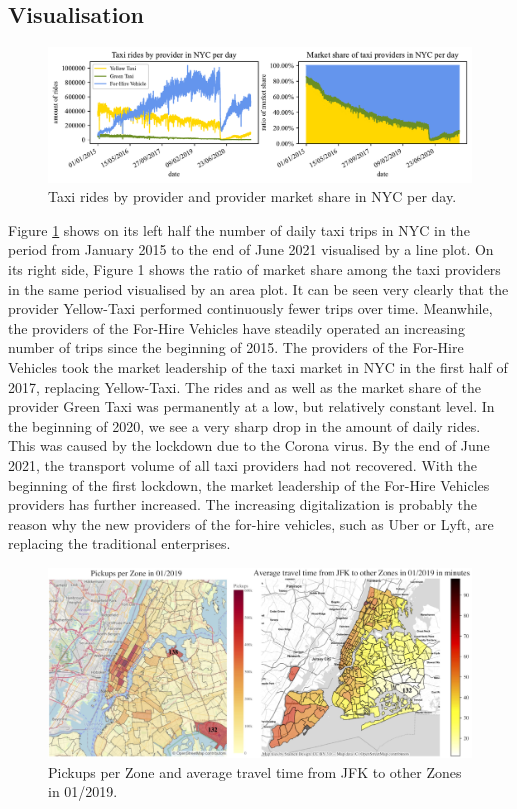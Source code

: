 \documentclass{article}
\begin{document}
\subsection{Visualisation}
\begin{figure}
  \setlength{}
  \centering
  \includegraphics[scale=0.63]{fig/taxi-rides-over-time.pdf}
  \caption{Taxi rides by provider and provider market share in NYC per day.}
  \label{fig:taxi-rides-over-time}
\end{figure}
\setlength{\textfloatsep}{10pt}
Figure \ref{fig:taxi-rides-over-time} shows on its left half the number of daily taxi trips in NYC in the period from January 2015 to the end of June 2021 visualised by a line plot. On its right side, Figure 1 shows the ratio of market share among the taxi providers in the same period visualised by an area plot. It can be seen very clearly that the provider Yellow-Taxi performed continuously fewer trips over time. Meanwhile, the providers of the For-Hire Vehicles have steadily operated an increasing number of trips since the beginning of 2015. The providers of the For-Hire Vehicles took the market leadership of the taxi market in NYC in the first half of 2017, replacing Yellow-Taxi. The rides and as well as the market share of the provider Green Taxi was permanently at a low, but relatively constant level. In the beginning of 2020, we see a very sharp drop in the amount of daily rides. This was caused by the lockdown due to the Corona virus. By the end of June 2021, the transport volume of all taxi providers had not recovered. With the beginning of the first lockdown, the market leadership of the For-Hire Vehicles providers has further increased. The increasing digitalization is probably the reason why the new providers of the for-hire vehicles, such as Uber or Lyft, are replacing the traditional enterprises.
\begin{figure}
  \setlength{}
  \centering
  \includegraphics[scale=0.47]{fig/maps-pickup-travel-time.pdf}
  \caption{Pickups per Zone and average travel time from JFK to other Zones in 01/2019.}
  \label{fig:maps-pickup-travel-time}
\end{figure}
\setlength{\textfloatsep}{10pt}
\end{document}
